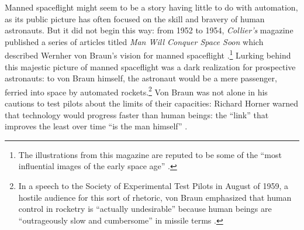 
Manned spaceflight might seem to be a story having little to do with
automation, as its public picture has often focused on the skill and
bravery of human astronauts. But it did not begin this way: from 1952
to 1954, \emph{Collier's} 
magazine published a series of articles 
titled \emph{Man Will Conquer Space Soon} which described Wernher von
Braun's vision for manned spaceflight
\cite{scribdColliers}.\footnote{The illustrations from this magazine 
  are reputed to be some of the ``most influential images of the early
space age'' \cite[p. 9]{marketingMoon}.} Lurking behind this majestic
picture of manned spaceflight was a dark 
realization for prospective astronauts: to von Braun himself, the
astronaut would be a mere passenger, ferried into space by automated
rockets.\footnote{In a speech to the Society of Experimental Test Pilots in
August of 1959, a hostile audience for this sort of rhetoric, von
Braun emphasized that human control in rocketry is ``actually
undesirable'' because human beings are ``outrageously slow and
cumbersome'' in missile terms \cite[p. 66-67]{DM}.} Von Braun
was not alone in his cautions to
test pilots about the limits of their capacities: Richard Horner
warned that technology would progress
faster than human beings: the ``link'' that improves the least over time ``is
the man himself'' \cite[p. 19]{DM}. 



